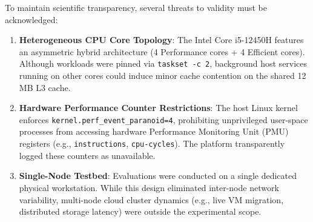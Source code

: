 To maintain scientific transparency, several threats to validity must be acknowledged:
\begin{enumerate}
    \item \textbf{Heterogeneous CPU Core Topology}: The Intel Core i5-12450H features an asymmetric hybrid architecture (4 Performance cores + 4 Efficient cores). Although workloads were pinned via \texttt{taskset -c 2}, background host services running on other cores could induce minor cache contention on the shared 12 MB L3 cache.
    \item \textbf{Hardware Performance Counter Restrictions}: The host Linux kernel enforces \texttt{kernel.perf\_}\allowbreak\texttt{event\_}\allowbreak\texttt{paranoid=4}, prohibiting unprivileged user-space processes from accessing hardware Performance Monitoring Unit (PMU) registers (e.g., \texttt{instructions}, \texttt{cpu-cycles}). The platform transparently logged these counters as unavailable.
    \item \textbf{Single-Node Testbed}: Evaluations were conducted on a single dedicated physical workstation. While this design eliminated inter-node network variability, multi-node cloud cluster dynamics (e.g., live VM migration, distributed storage latency) were outside the experimental scope.
\end{enumerate}
